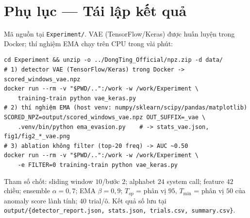 \appendix
\section{Phụ lục — Tái lập kết quả}\label{sec:repro}
Mã nguồn tại \texttt{Experiment/}. VAE (TensorFlow/Keras) được huấn luyện trong Docker; thí nghiệm EMA chạy trên CPU trong vài phút:
\begin{verbatim}
cd Experiment && unzip -o ../DongTing_Official/npz.zip -d data/
# 1) detector VAE (TensorFlow/Keras) trong Docker -> scored_windows_vae.npz
docker run --rm -v "$PWD/..":/work -w /work/Experiment \
    training-train python vae_keras.py
# 2) thí nghiệm EMA (host venv: numpy/sklearn/scipy/pandas/matplotlib)
SCORED_NPZ=output/scored_windows_vae.npz OUT_SUFFIX=_vae \
    .venv/bin/python ema_evasion.py    # -> stats_vae.json, fig1/fig2_*_vae.png
# 3) ablation không filter (top-20 freq) -> AUC ~0.50
docker run --rm -v "$PWD/..":/work -w /work/Experiment \
    -e FILTER=0 training-train python vae_keras.py
\end{verbatim}
Tham số chốt: sliding window $10$/bước $2$; alphabet $24$ system call; feature $42$ chiều; ensemble $\alpha=0{,}7$; EMA $\beta=0{,}9$; $T_{op}$ = phân vị $95$, $T_{\min}$ = phân vị $50$ của anomaly score lành tính; $40$ trial/ô. Kết quả số lưu tại \texttt{output/\{detector\_report.json, stats.json, trials.csv, summary.csv\}}.
